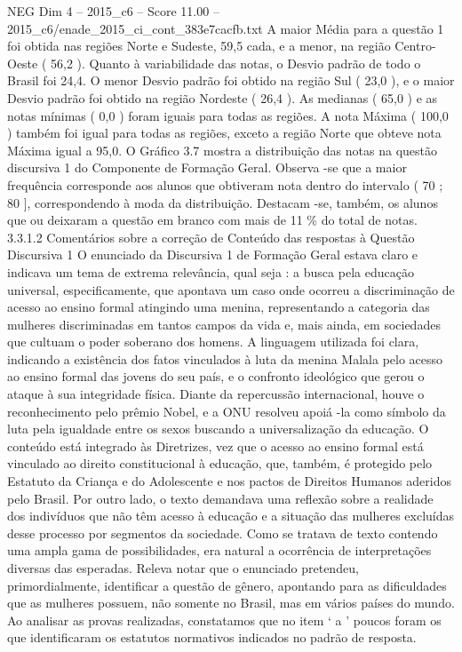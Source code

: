 \begin{textsample}{NEG Dim 4 – 2015\_c6 – Score 11.00 – 2015\_c6/enade\_2015\_ci\_cont\_383e7cacfb.txt}
A maior Média para a questão 1 foi obtida nas regiões Norte e Sudeste, 59,5 cada, e a menor, na região Centro-Oeste ( 56,2 ).
Quanto à variabilidade das notas, o Desvio padrão de todo o Brasil foi 24,4.
O menor Desvio padrão foi obtido na região Sul ( 23,0 ), e o maior Desvio padrão foi obtido na região Nordeste ( 26,4 ).
As medianas ( 65,0 ) e as notas mínimas ( 0,0 ) foram iguais para todas as regiões.
A nota Máxima ( 100,0 ) também foi igual para todas as regiões, exceto a região Norte que obteve nota Máxima igual a 95,0.
O Gráfico 3.7 mostra a distribuição das notas na questão discursiva 1 do Componente de Formação Geral.
Observa -se que a maior frequência corresponde aos alunos que obtiveram nota dentro do intervalo ( 70 ; 80 ], correspondendo à moda da distribuição.
Destacam -se, também, os alunos que ou deixaram a questão em branco com mais de 11 \% do total de notas. 3.3.1.2 Comentários sobre a correção de Conteúdo das respostas à Questão Discursiva 1 O enunciado da Discursiva 1 de Formação Geral estava claro e indicava um tema de extrema relevância, qual seja : a busca pela educação universal, especificamente, que apontava um caso onde ocorreu a discriminação de acesso ao ensino formal atingindo uma menina, representando a categoria das mulheres discriminadas em tantos campos da vida e, mais ainda, em sociedades que cultuam o poder soberano dos homens.
A linguagem utilizada foi clara, indicando a existência dos fatos vinculados à luta da menina Malala pelo acesso ao ensino formal das jovens do seu país, e o confronto ideológico que gerou o ataque à sua integridade física.
Diante da repercussão internacional, houve o reconhecimento pelo prêmio Nobel, e a ONU resolveu apoiá -la como símbolo da luta pela igualdade entre os sexos buscando a universalização da educação.
O conteúdo está integrado às Diretrizes, vez que o acesso ao ensino formal está vinculado ao direito constitucional à educação, que, também, é protegido pelo Estatuto da Criança e do Adolescente e nos pactos de Direitos Humanos aderidos pelo Brasil.
Por outro lado, o texto demandava uma reflexão sobre a realidade dos indivíduos que não têm acesso à educação e a situação das mulheres excluídas desse processo por segmentos da sociedade.
Como se tratava de texto contendo uma ampla gama de possibilidades, era natural a ocorrência de interpretações diversas das esperadas.
Releva notar que o enunciado pretendeu, primordialmente, identificar a questão de gênero, apontando para as dificuldades que as mulheres possuem, não somente no Brasil, mas em vários países do mundo.
Ao analisar as provas realizadas, constatamos que no item ‘ a ’ poucos foram os que identificaram os estatutos normativos indicados no padrão de resposta.

\end{textsample}
